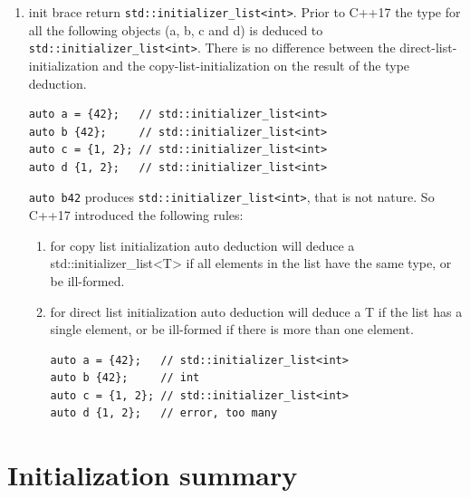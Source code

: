 \documentclass[a4paper,11pt,twoside]{book}
\begin{document}
\begin{enumerate}
		\item init brace return \texttt{std::initializer\_list<int>}. Prior to C++17 the type for all the following objects (a, b, c and d) is deduced to \texttt{std::initializer\_list<int>}. There is no difference between the direct-list-initialization and the copy-list-initialization on the result of the type deduction.
		
\begin{lstlisting}[numbers=none]
auto a = {42};   // std::initializer_list<int>
auto b {42};     // std::initializer_list<int>
auto c = {1, 2}; // std::initializer_list<int>
auto d {1, 2};   // std::initializer_list<int>
\end{lstlisting}
		\texttt{auto b{42}} produces \texttt{std::initializer\_list<int>}, that is not nature. So C++17 introduced the following rules: 
		\begin{enumerate}
		
		\item  for copy list initialization auto deduction will deduce a std::initializer\_list<T> if all elements in the list have the same type, or be ill-formed.
		
		\item for direct list initialization auto deduction will deduce a T if the list has a single element, or be ill-formed if there is more than one element.
\begin{lstlisting}[numbers=none]
auto a = {42};   // std::initializer_list<int>
auto b {42};     // int
auto c = {1, 2}; // std::initializer_list<int>
auto d {1, 2};   // error, too many 
\end{lstlisting}

	\end{enumerate}
	\end{enumerate}


\section{Initialization summary}
\end{document}
